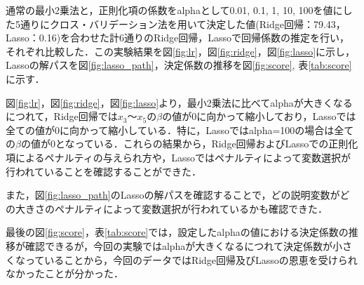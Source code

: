 \documentclass[a4paper,twocolumn]{ujarticle} %
\begin{document}
通常の最小2乗法と，正則化項の係数をalphaとして0.01, 0.1, 1, 10, 100を値にした5通りにクロス・バリデーション法を用いて決定した値(Ridge回帰：79.43，Lasso：0.16)を合わせた計6通りのRidge回帰，Lassoで回帰係数の推定を行い，それぞれ比較した．この実験結果を図\ref{fig:lr}，図\ref{fig:ridge}，図\ref{fig:lasso}に示し，Lassoの解パスを図\ref{fig:lasso_path}，決定係数の推移を図\ref{fig:score}, 表\ref{tab:score}に示す．

図\ref{fig:lr}，図\ref{fig:ridge}，図\ref{fig:lasso}より，最小2乗法に比べてalphaが大きくなるにつれて，Ridge回帰では$x_3$〜$x_5$の$\beta$の値が0に向かって縮小しており，Lassoでは全ての値が0に向かって縮小している．特に，Lassoではalpha=100の場合は全ての$\beta$の値が0となっている．これらの結果から，Ridge回帰およびLassoでの正則化項によるペナルティの与えられ方や，Lassoではペナルティによって変数選択が行われていることを確認することができた．

また，図\ref{fig:lasso_path}のLassoの解パスを確認することで，どの説明変数がどの大きさのペナルティによって変数選択が行われているかも確認できた．

最後の図\ref{fig:score}，表\ref{tab:score}では，設定したalphaの値における決定係数の推移が確認できるが，今回の実験ではalphaが大きくなるにつれて決定係数が小さくなっていることから，今回のデータではRidge回帰及びLassoの恩恵を受けられなかったことが分かった．
\end{document}
